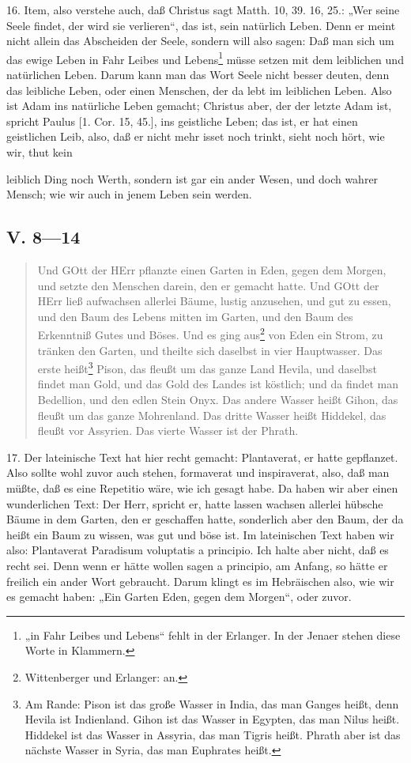 16. Item, also verstehe auch, daß Christus sagt Matth. 10, 39. 16, 25.: „Wer seine Seele findet, der wird sie verlieren“, das ist, sein natürlich Leben. Denn er meint nicht allein das Abscheiden der Seele, sondern will also sagen: Daß man sich um das ewige Leben in Fahr Leibes und Lebens\footnote{„in Fahr Leibes und Lebens“ fehlt in der Erlanger. In der Jenaer stehen diese Worte in Klammern.} müsse setzen mit dem leiblichen und natürlichen Leben. Darum kann man das Wort Seele nicht besser deuten, denn das leibliche Leben, oder einen Menschen, der da lebt im leiblichen Leben. Also ist Adam ins natürliche Leben gemacht; Christus aber, der der letzte Adam ist, spricht Paulus [1. Cor. 15, 45.], ins geistliche Leben; das ist, er hat einen geistlichen Leib, also, daß er nicht mehr isset noch trinkt, sieht noch hört, wie wir, thut kein

leiblich Ding noch Werth, sondern ist gar ein ander Wesen, und doch wahrer Mensch; wie wir auch in jenem Leben sein werden.

\subsection[V. 8—14]{V. 8—14}

\begin{quote}
Und GOtt der HErr pflanzte einen Garten in Eden, gegen dem Morgen, und setzte den Menschen darein, den er gemacht hatte. Und GOtt der HErr ließ aufwachsen allerlei Bäume, lustig anzusehen, und gut zu essen, und den Baum des Lebens mitten im Garten, und den Baum des Erkenntniß Gutes und Böses. Und es ging aus\footnote{Wittenberger und Erlanger: an.} von Eden ein Strom, zu tränken den Garten, und theilte sich daselbst in vier Hauptwasser. Das erste heißt\footnote{Am Rande: Pison ist das große Wasser in India, das man Ganges heißt, denn Hevila ist Indienland. Gihon ist das Wasser in Egypten, das man Nilus heißt. Hiddekel ist das Wasser in Assyria, das man Tigris heißt. Phrath aber ist das nächste Wasser in Syria, das man Euphrates heißt.} Pison, das fleußt um das ganze Land Hevila, und daselbst findet man Gold, und das Gold des Landes ist köstlich; und da findet man Bedellion, und den edlen Stein Onyx. Das andere Wasser heißt Gihon, das fleußt um das ganze Mohrenland. Das dritte Wasser heißt Hiddekel, das fleußt vor Assyrien. Das vierte Wasser ist der Phrath.
\end{quote}

17. Der lateinische Text hat hier recht gemacht: Plantaverat, er hatte gepflanzet. Also sollte wohl zuvor auch stehen, formaverat und inspiraverat, also, daß man müßte, daß es eine Repetitio wäre, wie ich gesagt habe. Da haben wir aber einen wunderlichen Text: Der Herr, spricht er, hatte lassen wachsen allerlei hübsche Bäume in dem Garten, den er geschaffen hatte, sonderlich aber den Baum, der da heißt ein Baum zu wissen, was gut und böse ist. Im lateinischen Text haben wir also: Plantaverat Paradisum voluptatis a principio. Ich halte aber nicht, daß es recht sei. Denn wenn er hätte wollen sagen a principio, am Anfang, so hätte er freilich ein ander Wort gebraucht. Darum klingt es im Hebräischen also, wie wir es gemacht haben: „Ein Garten Eden, gegen dem Morgen“, oder zuvor.

